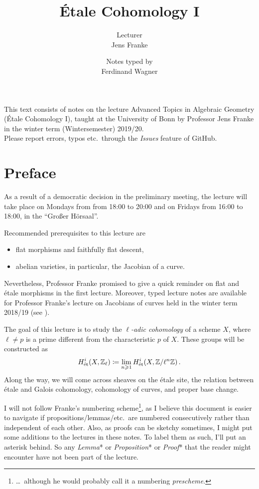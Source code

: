 \documentclass[a4paper, 10pt, oneside, DIV=9, chapterprefix=true, numbers=enddot]{scrbook}
\title{Étale Cohomology I}
\author{{\normalsize Lecturer}\\
	Jens Franke}
\date{{\normalsize Notes typed by}\\
	Ferdinand Wagner}
\begin{document}
	\frontmatter
	\maketitle
	\noindent This text consists of notes on the lecture Advanced Topics in Algebraic Geometry (Étale Cohomology I), taught at the University of
	Bonn by Professor Jens Franke in the winter term (Wintersemester) 2019/20.\\[\thmsep]Please report errors, typos etc.\ through the \emph{Issues} feature of GitHub.
	
	
	\tableofcontents
	\chapter{Preface}
	As a result of a democratic decision in the preliminary meeting, the lecture will take place on Mondays from from 18:00 to 20:00 and on Fridays from 16:00 to 18:00, in the \enquote{Großer Hörsaal}.
	
	Recommended prerequisites to this lecture are
	\begin{itemize}
		\item flat morphisms and faithfully flat descent,
		\item abelian varieties, in particular, the Jacobian of a curve.
	\end{itemize}
	Nevertheless, Professor Franke promised to give a quick reminder on flat and étale morphisms in the first lecture. Moreover, typed lecture notes are available for Professor Franke's lecture on Jacobians of curves held in the winter term 2018/19 (see \cite{jacobians}). 
	
	The goal of this lecture is to study the \emph{$\ell$-adic cohomology} of a scheme $X$, where $\ell\neq p$ is a prime different from the characteristic $p$ of $X$. These groups will be constructed as
	\begin{align*}
		H_{\mathrm{\acute{e}t}}^i(X,\mathbb{Z}_\ell)\coloneqq\lim_{n\geqslant 1}H_{\mathrm{\acute{e}t}}^i(X,\mathbb{Z}/\ell^n\mathbb{Z})\,.
	\end{align*}
	Along the way, we will come across sheaves on the étale site, the relation between étale and Galois cohomology, cohomology of curves, and proper base change.
	
	I will not follow Franke's numbering scheme\footnote{\ldots\ although he would probably call it a numbering \emph{prescheme}.}, as I believe this document is easier to navigate if propositions/lemmas/etc.\ are numbered consecutively rather than independent of each other. Also, as proofs can be sketchy sometimes, I might put some additions to the lectures in these notes. To label them as such, I'll put an asterisk behind. So any \emph{Lemma}* or \emph{Proposition}* or \emph{Proof}* that the reader might encounter have not been part of the lecture.
	
\end{document}
